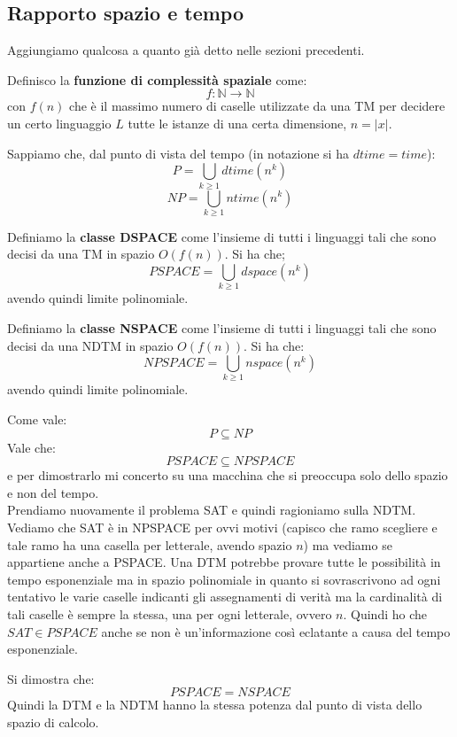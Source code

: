 \documentclass[a4paper,12pt, oneside]{book}
\begin{document}
\subsection{Rapporto spazio e tempo}
Aggiungiamo qualcosa a quanto già detto nelle sezioni precedenti.\\
\begin{definizione}
  Definisco la \textbf{funzione di complessità spaziale} come:
  \[f:\mathbb{N}\to\mathbb{N}\]
  con $f(n)$ che è il massimo numero di caselle utilizzate da una TM per
  decidere un certo linguaggio $L$ tutte le istanze di una certa dimensione,
  $n=|x|$. 
\end{definizione}
Sappiamo che, dal punto di vista del tempo (in notazione si ha $dtime=time$):
\[P=\bigcup_{k\geq 1}dtime(n^k)\]
\[NP=\bigcup_{k\geq 1}ntime(n^k)\]
\begin{definizione}
  Definiamo la \textbf{classe DSPACE} come l'insieme di tutti i linguaggi tali
  che sono decisi da una TM in spazio $O(f(n))$. Si ha che;
  \[PSPACE=\bigcup_{k\geq 1}dspace(n^k)\]
  avendo quindi limite polinomiale.
\end{definizione}
\begin{definizione}
  Definiamo la \textbf{classe NSPACE} come l'insieme di tutti i linguaggi tali
  che sono decisi da una NDTM in spazio $O(f(n))$. Si ha che:
  \[NPSPACE=\bigcup_{k\geq 1}nspace(n^k)\]
  avendo quindi limite polinomiale.
\end{definizione}
Come vale:
\[P\subseteq NP\]
Vale che:
\[PSPACE\subseteq NPSPACE\]
e per dimostrarlo mi concerto su una macchina che si preoccupa solo dello spazio
e non del tempo.\\
Prendiamo nuovamente il problema SAT e quindi ragioniamo sulla NDTM. Vediamo che
SAT è in NPSPACE per ovvi motivi (capisco che ramo scegliere e tale ramo ha una
casella per letterale, avendo spazio $n$) ma vediamo se appartiene anche a
PSPACE. Una DTM potrebbe provare tutte le possibilità in tempo esponenziale ma
in spazio polinomiale in quanto si sovrascrivono ad ogni tentativo le varie
caselle indicanti gli assegnamenti di verità ma la cardinalità di tali caselle è
sempre la stessa, una per ogni letterale, ovvero $n$. Quindi ho che $SAT\in
PSPACE$ anche se non è un'informazione così eclatante a causa del tempo
esponenziale.
\begin{teorema}
  Si dimostra che:
  \[PSPACE=NSPACE\]
  Quindi la DTM e la NDTM hanno la stessa potenza dal punto di vista dello
  spazio di calcolo.
\end{teorema}
\end{document}
